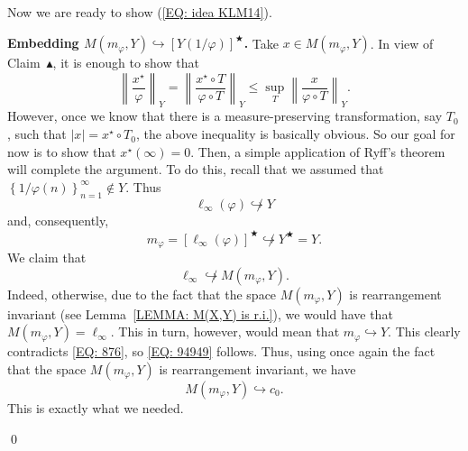 \documentclass[11pt]{amsart}
\theoremstyle{definition}
\theoremstyle{definition}
\theoremstyle{definition}
\theoremstyle{definition}
\theoremstyle{definition}
\theoremstyle{definition}
\theoremstyle{definition}
\theoremstyle{definition}
\numberwithin{equation}{section}
\numberwithin{equation}{section}
\numberwithin{equation}{section}
\theoremstyle{definition}
\theoremstyle{definition}
\theoremstyle{definition}
\theoremstyle{definition}
\theoremstyle{definition}
\theoremstyle{definition}
\newcommand{\norm}[1]{\left\lVert#1\right\rVert}
\newcommand{\abs}[1]{\left\lvert#1\right\rvert}
\renewenvironment{proof}{\noindent {\bf Proof.}}{\qed}
\begin{document}
\begin{proof}
			Now we are ready to show (\ref{EQ: idea KLM14}).
			
			{\bf Embedding $M(m_{\varphi},Y) \hookrightarrow \left[ Y\left( 1 / \varphi \right) \right]^{\bigstar}$.}
			Take $x \in M(m_{\varphi},Y)$. In view of Claim~$\blacktriangle$, it is enough to show that
			\begin{equation*}
				\norm{\frac{x^{\star}}{\varphi}}_{Y}
					= \norm{\frac{x^{\star} \circ T}{\varphi \circ T}}_Y
					\leqslant \sup\limits_{T} \norm{\frac{x}{\varphi \circ T}}_Y.
			\end{equation*}
			However, once we know that there is a measure-preserving transformation, say $T_0$, such that $\abs{x} = x^{\star} \circ T_0$,
			the above inequality is basically obvious. So our goal for now is to show that $ x^{\star}(\infty) = 0$. Then, a simple application
			of Ryff's theorem will complete the argument. To do this, recall that we assumed that $\left\{ 1 / \varphi(n) \right\}_{n=1}^{\infty} \notin Y$.
			Thus
			\begin{equation*}
				\ell_{\infty}(\varphi) \not\hookrightarrow Y
			\end{equation*}
			and, consequently,
			\begin{equation} \label{EQ: 876}
				m_{\varphi} = \left[ \ell_{\infty}(\varphi) \right]^{\bigstar} \not\hookrightarrow Y^{\bigstar} = Y.
			\end{equation}
			We claim that
			\begin{equation} \label{EQ: 94949}
				\ell_{\infty} \not\hookrightarrow M(m_{\varphi}, Y).
			\end{equation}
			Indeed, otherwise, due to the fact that the space $M(m_{\varphi}, Y)$ is rearrangement invariant (see Lemma~\ref{LEMMA: M(X,Y) is r.i.}),
			we would have that $M(m_{\varphi}, Y) = \ell_{\infty}$. This in turn, however, would mean that $m_{\varphi} \hookrightarrow Y$.
			This clearly contradicts \eqref{EQ: 876}, so \eqref{EQ: 94949} follows.
			Thus, using once again the fact that the space $M(m_{\varphi}, Y)$ is rearrangement invariant, we have
			\begin{equation*}
				M(m_{\varphi}, Y) \hookrightarrow c_0.
			\end{equation*}
			This is exactly what we needed.
			

\end{proof}
\end{document}

